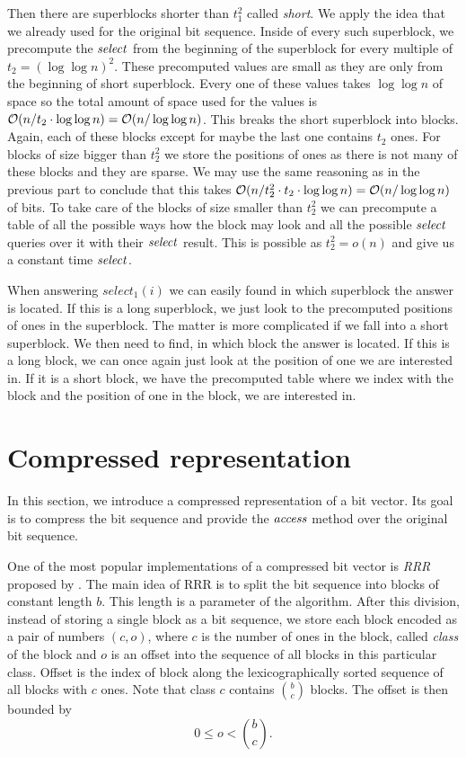 Then there are superblocks shorter than $t_1^2$ called
\textit{short}. We apply the idea that we already used for the original bit sequence. Inside of
every such superblock, we precompute the $\mathit{select}$ from the beginning of the superblock for every
multiple of $t_2=(\log\log n)^2$. These precomputed values are small as they are only from the
beginning of short superblock. Every one of these values takes $\log\log n$ of space so the
total amount of space used for the values is $\mathcal{O}(n/t_2\cdot \log\log n) = \mathcal{O}(n/\log\log n)$.
This breaks the short superblock into blocks. Again, each of these blocks except for maybe the
last one contains $t_2$ ones. For blocks of size bigger than $t_2^2$ we store the positions of
ones as there is not many of these blocks and they are sparse. We may use the same reasoning as
in the previous part to conclude that this takes $\mathcal{O}(n/t_2^2\cdot t_2\cdot \log\log n) = \mathcal{O}(n/\log\log n)$
of bits. To take care of the blocks of size smaller than $t_2^2$ we can precompute a table of all
the possible ways how the block may look and all the possible $\mathit{select}$ queries over it with
their $\mathit{select}$ result. This is possible as $t_2^2 = o(n)$ and give us a constant time $\mathit{select}$.

When answering $select_1(i)$ we can easily found in which superblock the answer is located. If this
is a long superblock, we just look to the precomputed positions of ones in the superblock. The matter
is more complicated if we fall into a short superblock. We then need to find, in which block the answer
is located. If this is a long block, we can once again just look at the position of one we are interested
in. If it is a short block, we have the precomputed table where we index with the block and the position of
one in the block, we are interested in.

\section{Compressed representation}
\label{section:compressed_bv}

In this section, we introduce a compressed representation of a bit vector. Its goal is to
compress the bit sequence and provide the $\mathit{access}$ method over the original bit sequence.

One of the most popular implementations of a compressed bit vector is \textit{RRR} proposed by
\cite{raman2007succinct}. The main idea of RRR is to split the bit sequence into blocks
of constant length $b$. This length is a parameter of the algorithm. After this division, instead
of storing a single block as a bit sequence, we store each block encoded as a pair
of numbers $(c, o)$, where $c$ is the number of ones in the block, called \emph{class}
of the block and $o$ is an offset into the sequence of all blocks in this particular class.
Offset is the index of block along the lexicographically sorted sequence of all blocks with
$c$ ones. Note that class $c$ contains ${b\choose c}$ blocks. The offset is then bounded by
$$0 \leq o < {b\choose c}.$$

